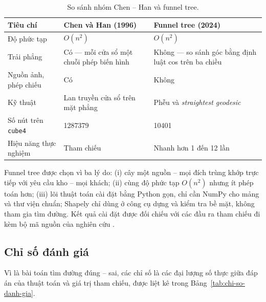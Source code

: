 \begin{table}[!t]
  \caption{So sánh nhóm Chen -- Han và funnel tree.}
  \label{tab:chenhan-vs-funnel}
  {\fontsize{7}{8.6}\selectfont
  \begin{tabular}{@{}>{\raggedright\arraybackslash}p{48pt}>{\raggedright\arraybackslash}p{66pt}>{\raggedright\arraybackslash}p{66pt}@{}}
    \toprule
    \textbf{Tiêu chí} & \textbf{Chen và Han (1996)} & \textbf{Funnel tree (2024)} \\
    \midrule
    Độ phức tạp & $O(n^2)$ & $O(n^2)$ \\
    Trải phẳng & Có --- mỗi cửa sổ một chuỗi phép biến hình & Không --- so sánh
      góc bằng định luật cos trên ba chiều \\
    Nguồn ảnh, phép chiếu & Có & Không \\
    Kỹ thuật & Lan truyền cửa sổ trên mặt phẳng & Phễu và \emph{straightest
      geodesic} \\
    Số nút trên \texttt{cube4} & \num{1287379} & \num{10401} \\
    Hiệu năng thực nghiệm & Tham chiếu & Nhanh hơn 1 đến 12 lần \\
    \bottomrule
  \end{tabular}}
\end{table}

Funnel tree được chọn vì ba lý do: (i) cây một nguồn -- mọi đích trùng khớp trực
tiếp với yêu cầu kho -- mọi khách; (ii) cùng độ phức tạp $O(n^2)$ nhưng ít phép
toán hơn; (iii) lõi thuật toán cài đặt bằng Python gọn, chỉ cần NumPy cho mảng và thư
viện chuẩn; Shapely chỉ dùng ở công cụ dựng và kiểm tra bề mặt, không tham gia
tìm đường. Kết quả cài đặt được đối chiếu với các đầu ra tham
chiếu đi kèm bộ mã nguồn của nghiên cứu \cite{quangnguyen2025}.

\subsection{Chỉ số đánh giá}

Vì là bài toán tìm đường đúng -- sai, các chỉ số là các đại lượng số thực giữa đáp
án của thuật toán và giá trị tham chiếu, được liệt kê trong
Bảng~\ref{tab:chi-so-danh-gia}.

